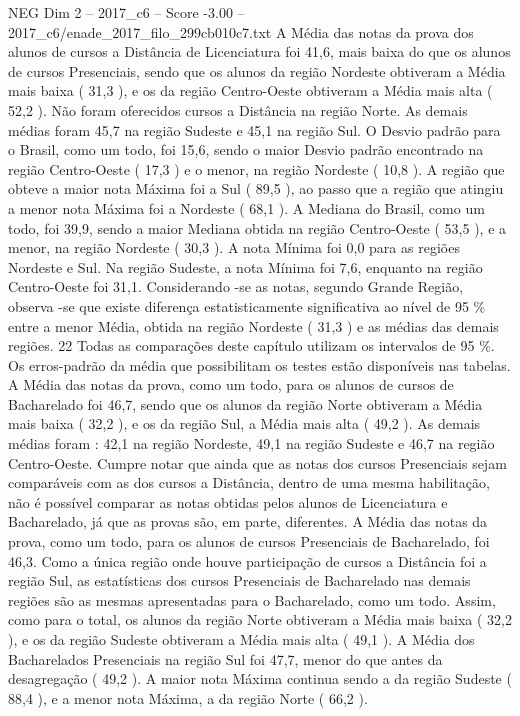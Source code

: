 \begin{textsample}{NEG Dim 2 – 2017\_c6 – Score -3.00 – 2017\_c6/enade\_2017\_filo\_299cb010c7.txt}
A Média das notas da prova dos alunos de cursos a Distância de Licenciatura foi 41,6, mais baixa do que os alunos de cursos Presenciais, sendo que os alunos da região Nordeste obtiveram a Média mais baixa ( 31,3 ), e os da região Centro-Oeste obtiveram a Média mais alta ( 52,2 ).
Não foram oferecidos cursos a Distância na região Norte.
As demais médias foram 45,7 na região Sudeste e 45,1 na região Sul.
O Desvio padrão para o Brasil, como um todo, foi 15,6, sendo o maior Desvio padrão encontrado na região Centro-Oeste ( 17,3 ) e o menor, na região Nordeste ( 10,8 ).
A região que obteve a maior nota Máxima foi a Sul ( 89,5 ), ao passo que a região que atingiu a menor nota Máxima foi a Nordeste ( 68,1 ).
A Mediana do Brasil, como um todo, foi 39,9, sendo a maior Mediana obtida na região Centro-Oeste ( 53,5 ), e a menor, na região Nordeste ( 30,3 ).
A nota Mínima foi 0,0 para as regiões Nordeste e Sul.
Na região Sudeste, a nota Mínima foi 7,6, enquanto na região Centro-Oeste foi 31,1.
Considerando -se as notas, segundo Grande Região, observa -se que existe diferença estatisticamente significativa ao nível de 95 \% entre a menor Média, obtida na região Nordeste ( 31,3 ) e as médias das demais regiões. 22 Todas as comparações deste capítulo utilizam os intervalos de 95 \%.
Os erros-padrão da média que possibilitam os testes estão disponíveis nas tabelas.
A Média das notas da prova, como um todo, para os alunos de cursos de Bacharelado foi 46,7, sendo que os alunos da região Norte obtiveram a Média mais baixa ( 32,2 ), e os da região Sul, a Média mais alta ( 49,2 ).
As demais médias foram : 42,1 na região Nordeste, 49,1 na região Sudeste e 46,7 na região Centro-Oeste.
Cumpre notar que ainda que as notas dos cursos Presenciais sejam comparáveis com as dos cursos a Distância, dentro de uma mesma habilitação, não é possível comparar as notas obtidas pelos alunos de Licenciatura e Bacharelado, já que as provas são, em parte, diferentes.
A Média das notas da prova, como um todo, para os alunos de cursos Presenciais de Bacharelado, foi 46,3.
Como a única região onde houve participação de cursos a Distância foi a região Sul, as estatísticas dos cursos Presenciais de Bacharelado nas demais regiões são as mesmas apresentadas para o Bacharelado, como um todo.
Assim, como para o total, os alunos da região Norte obtiveram a Média mais baixa ( 32,2 ), e os da região Sudeste obtiveram a Média mais alta ( 49,1 ).
A Média dos Bacharelados Presenciais na região Sul foi 47,7, menor do que antes da desagregação ( 49,2 ).
A maior nota Máxima continua sendo a da região Sudeste ( 88,4 ), e a menor nota Máxima, a da região Norte ( 66,2 ).

\end{textsample}
